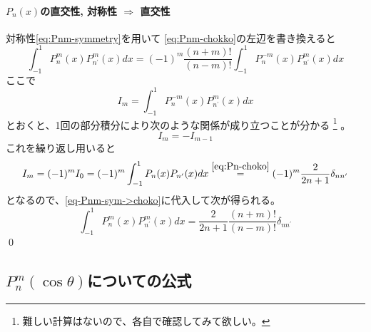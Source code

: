 \documentclass[../main/main]{subfiles}
\begin{document}
\paragraph{$P_n(x)$の直交性, 対称性 $\Longrightarrow$ 直交性}
対称性\eqref{eq:Pnm-symmetry}を用いて
\eqref{eq:Pnm-chokko}の左辺を書き換えると
\begin{equation}\label{eq-Pnm-sym->choko}
   \int_{-1}^1 P_n^m(x) P_{n^\prime}^m (x) dx
	= (-1)^m \frac{(n+m)!}{(n-m)!} \int_{-1}^1 P_n^{-m}(x) P_{n^\prime}^m (x) dx
\end{equation}
ここで
\begin{equation*}
  I_m = \int_{-1}^1 P_n^{-m}(x) P_{n^\prime}^m (x) dx
\end{equation*}
とおくと、1回の部分積分により次のような関係が成り立つことが分かる
\footnote{難しい計算はないので、各自で確認してみて欲しい。}
。
\begin{equation*}
  I_m = - I_{m-1}
\end{equation*}
これを繰り返し用いると
\begin{equation*}
  I_m = (-1)^m I_0
	= (-1)^m \int_{-1}^1 P_n (x) P_{n^\prime} (x) dx
	\overset{\eqref{eq:Pn-choko}}{=} (-1)^m \frac{2}{2n+1} \delta_{n n^\prime}
\end{equation*}
となるので、\eqref{eq-Pnm-sym->choko}に代入して次が得られる。
\begin{equation*}
  \int_{-1}^1 P_n^m(x) P_{n^\prime}^m (x) dx
	= \frac{2}{2n+1} \frac{(n+m)!}{(n-m)!} \delta_{n n^\prime}
\end{equation*}\qed


\subsection{$P_n^m (\cos \theta)$についての公式}
\end{document}
